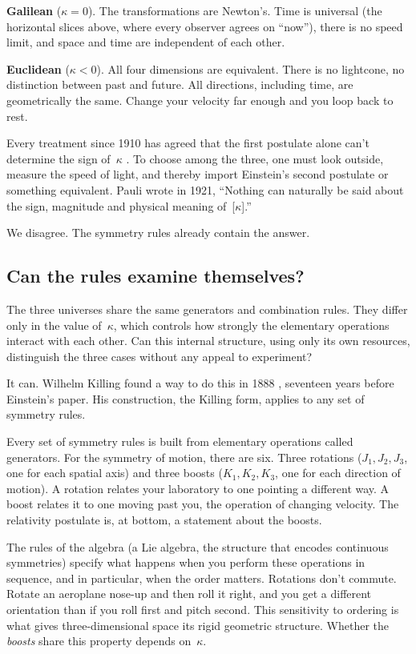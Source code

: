 \documentclass[11pt]{article}
\begin{document}
\smallskip
\noindent\textbf{Galilean} ($\kappa = 0$). The transformations are Newton's. Time is universal (the horizontal slices above, where every observer agrees on ``now''), there is no speed limit, and space and time are independent of each other.

\smallskip
\noindent\textbf{Euclidean} ($\kappa < 0$). All four dimensions are equivalent. There is no lightcone, no distinction between past and future. All directions, including time, are geometrically the same. Change your velocity far enough and you loop back to rest.

\medskip
Every treatment since 1910 has agreed that the first postulate alone can't determine the sign of~$\kappa$ \cite{Ignatowski1910,Pauli1921,BerziGorini1969,LevyLeblond1976,Mermin1984,Pal2003,Silagadze2007,Drory2015}. To choose among the three, one must look outside, measure the speed of light, and thereby import Einstein's second postulate or something equivalent. Pauli wrote in 1921, ``Nothing can naturally be said about the sign, magnitude and physical meaning of~[$\kappa$].''

We disagree. The symmetry rules already contain the answer.


\subsection*{Can the rules examine themselves?}

The three universes share the same generators and combination rules. They differ only in the value of~$\kappa$, which controls how strongly the elementary operations interact with each other. Can this internal structure, using only its own resources, distinguish the three cases without any appeal to experiment?

It can. Wilhelm Killing found a way to do this in 1888 \cite{Killing1888}, seventeen years before Einstein's paper. His construction, the Killing form, applies to any set of symmetry rules.

Every set of symmetry rules is built from elementary operations called generators. For the symmetry of motion, there are six. Three rotations ($J_1, J_2, J_3$, one for each spatial axis) and three boosts ($K_1, K_2, K_3$, one for each direction of motion). A rotation relates your laboratory to one pointing a different way. A boost relates it to one moving past you, the operation of changing velocity. The relativity postulate is, at bottom, a statement about the boosts.

The rules of the algebra (a Lie algebra, the structure that encodes continuous symmetries) specify what happens when you perform these operations in sequence, and in particular, when the order matters. Rotations don't commute. Rotate an aeroplane nose-up and then roll it right, and you get a different orientation than if you roll first and pitch second. This sensitivity to ordering is what gives three-dimensional space its rigid geometric structure. Whether the \emph{boosts} share this property depends on~$\kappa$.
\end{document}
